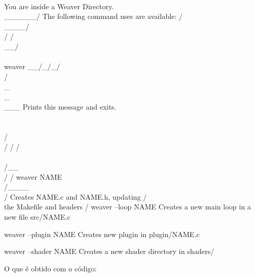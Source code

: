 {\alinhaverbatim
       \\              You are inside a Weaver Directory.
        \\______/      The following command uses are available:
        /\\____/\\
       / /\\__/\\ \\       weaver
    __/_/_/\\/\\_\\_\\___     Prints this message and exits.
      \\ \\ \\/\\/ / /
       \\ \\/__\\/ /       weaver NAME
        \\/____\\/          Creates NAME.c and NAME.h, updating
        /      \\          the Makefile and headers
       /
                          weaver --loop NAME
                           Creates a new main loop in a new file src/NAME.c

                          weaver --plugin NAME
                           Creates new plugin in plugin/NAME.c

                          weaver --shader NAME
                           Creates a new shader directory in shaders/
\alinhanormal

O que é obtido com o código:

}
